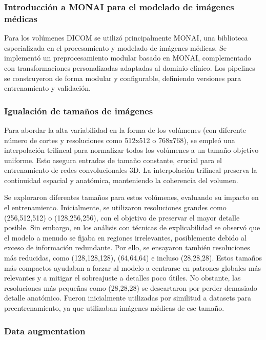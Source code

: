 \subsubsection{Introducción a MONAI para el modelado de imágenes médicas}

Para los volúmenes DICOM se utilizó principalmente MONAI, una biblioteca especializada en el procesamiento y modelado de imágenes médicas. Se implementó un preprocesamiento modular basado en MONAI, complementado con transformaciones personalizadas adaptadas al dominio clínico. Los pipelines se construyeron de forma modular y configurable, definiendo versiones para entrenamiento y validación. 

\subsubsection{Igualación de tamaños de imágenes}

Para abordar la alta variabilidad en la forma de los volúmenes (con diferente número de cortes y resoluciones como 512x512 o 768x768), se empleó una interpolación trilineal para normalizar todos los volúmenes a un tamaño objetivo uniforme. Esto asegura entradas de tamaño constante, crucial para el entrenamiento de redes convolucionales 3D. La interpolación trilineal preserva la continuidad espacial y anatómica, manteniendo la coherencia del volumen.

Se exploraron diferentes tamaños para estos volúmenes, evaluando su impacto en el entrenamiento. Inicialmente, se utilizaron resoluciones grandes como (256,512,512) o (128,256,256), con el objetivo de preservar el mayor detalle posible. Sin embargo, en los análisis con técnicas de explicabilidad se observó que el modelo a menudo se fijaba en regiones irrelevantes, posiblemente debido al exceso de información redundante. Por ello, se ensayaron también resoluciones más reducidas, como (128,128,128), (64,64,64) e incluso (28,28,28). Estos tamaños más compactos ayudaban a forzar al modelo a centrarse en patrones globales más relevantes y a mitigar el sobreajuste a detalles poco útiles. No obstante, las resoluciones más pequeñas como (28,28,28) se descartaron por perder demasiado detalle anatómico. Fueron inicialmente utilizadas por similitud a datasets para preentrenamiento, ya que utilizaban imágenes médicas de ese tamaño. 

\subsubsection{Data augmentation}

